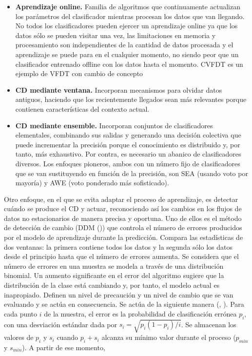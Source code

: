 \begin{itemize}
	\item \textbf{Aprendizaje online.} Familia de algoritmos que continuamente actualizan los parámetros del clasificador mientras procesan los datos que van llegando. No todos los clasificadores pueden ejercer un aprendizaje online ya que los datos sólo se pueden visitar una vez, las limitaciones en memoria y procesamiento son independientes de la cantidad de datos procesada y el aprendizaje se puede para en el cualquier momento, no siendo peor que un clasificador entrenado offline con los datos hasta el momento. CVFDT es un ejemplo de VFDT con cambio de concepto
	\item \textbf{CD mediante ventana.} Incorporan mecanismos para olvidar datos antiguos, haciendo que los recientemente llegados sean más relevantes porque contienen características del contexto actual. 
	\item \textbf{CD mediante ensemble.} Incorporan conjuntos de clasificadores elementales, combinando sus salidas y generando una decisión colectiva que puede incrementar la precisión porque el conocimiento es distribuido y, por tanto, más exhaustivo. Por contra, es necesario un abanico de clasificadores diversos. Los enfoques pioneros, ambos con un número fijo de clasificadores que se van sustituyendo en función de la precisión, son SEA (usando voto por mayoría) y AWE (voto ponderado más sofisticado).
\end{itemize}

Otro enfoque, en el que se evita adaptar el proceso de aprendizaje, es detectar cuándo se produce el CD y actuar, reconociendo así los cambios en los flujos de datos no estacionarios de manera precisa y oportuna. Uno de ellos es el método de detección de cambio (DDM (\cite{ddm})) que controla el número de errores producidos por el modelo de aprendizaje durante la predicción. Compara las estadísticas de dos ventanas: la primera contiene todos los datos y la segunda sólo los datos desde el principio hasta que el número de errores aumenta. Se considera que el número de errores en una muestra se modela a través de una distribución binomial. Un aumento significante en el error del algoritmo sugiere que la distribución de la clase está cambiando y, por tanto, el modelo actual es inapropiado. Definen un nivel de precaución y un nivel de cambio que se van evaluando y se actúa en consecuencia. Se actúa de la siguiente manera (\cite{moa-manual}, \cite{ddm}). Para cada punto $i$ de la muestra, el error es la probabilidad de clasificación errónea $p_i$, con una desviación estándar dada por $s_i = \sqrt{p_i (1-p_i)/i}$. Se almacenan los valores de $p_i$ y $s_i$ cuando $p_i+s_i$ alcanza su mínimo valor durante el proceso ($p_{min}$ y $s_{min}$). A partir de ese momento,

